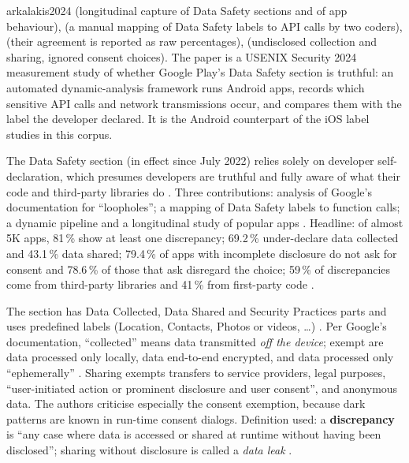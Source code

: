\begin{papercard}{arkalakis2024}
  (longitudinal capture of Data Safety sections and of app behaviour),  (a manual mapping of Data Safety labels to API calls by two coders),  (their agreement is reported as raw percentages),  (undisclosed collection and sharing, ignored consent choices). The paper is a USENIX Security 2024 measurement study of whether Google Play's Data Safety section is truthful: an automated dynamic-analysis framework runs Android apps, records which sensitive API calls and network transmissions occur, and compares them with the label the developer declared. It is the Android counterpart of the iOS label studies in this corpus.

 The Data Safety section (in effect since July 2022) relies solely on developer self-declaration, which presumes developers are truthful and fully aware of what their code and third-party libraries do . Three contributions: analysis of Google's documentation for ``loopholes''; a mapping of Data Safety labels to function calls; a dynamic pipeline and a longitudinal study of popular apps . Headline: of almost 5K apps, 81\,\% show at least one discrepancy; 69.2\,\% under-declare data collected and 43.1\,\% data shared; 79.4\,\% of apps with incomplete disclosure do not ask for consent and 78.6\,\% of those that ask disregard the choice; 59\,\% of discrepancies come from third-party libraries and 41\,\% from first-party code .

 The section has Data Collected, Data Shared and Security Practices parts and uses predefined labels (Location, Contacts, Photos or videos, \ldots) . Per Google's documentation, ``collected'' means data transmitted \emph{off the device}; exempt are data processed only locally, data end-to-end encrypted, and data processed only ``ephemerally'' . Sharing exempts transfers to service providers, legal purposes, ``user-initiated action or prominent disclosure and user consent'', and anonymous data. The authors criticise especially the consent exemption, because dark patterns are known in run-time consent dialogs. Definition used: a \textbf{discrepancy} is ``any case where data is accessed or shared at runtime without having been disclosed''; sharing without disclosure is called a \emph{data leak} .


\end{papercard}
